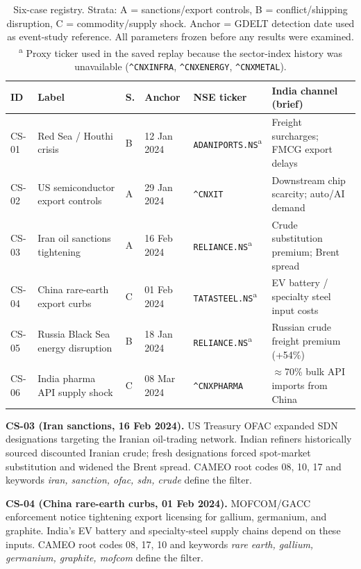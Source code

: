 \documentclass[10pt,a4paper,twocolumn]{article}
\begin{document}
\begin{table}[!t]
\centering
\caption{Six-case registry. Strata: A = sanctions/export controls, B = conflict/shipping disruption, C = commodity/supply shock. Anchor = GDELT detection date used as event-study reference. All parameters frozen before any results were examined. \textsuperscript{a} Proxy ticker used in the saved replay because the sector-index history was unavailable (\texttt{\^{}CNXINFRA}, \texttt{\^{}CNXENERGY}, \texttt{\^{}CNXMETAL}).}
\label{tab:caseregistry}
\small
\begin{tabular}{@{}p{1.0cm}p{4.2cm}p{0.6cm}p{2.1cm}p{2.3cm}p{5.0cm}@{}}
\toprule
\textbf{ID} & \textbf{Label} & \textbf{S.} & \textbf{Anchor} & \textbf{NSE ticker} & \textbf{India channel (brief)} \\
\midrule
CS-01 & Red Sea / Houthi crisis           & B & 12 Jan 2024 & \texttt{ADANIPORTS.NS}\textsuperscript{a}  & Freight surcharges; FMCG export delays \\
CS-02 & US semiconductor export controls  & A & 29 Jan 2024 & \texttt{\^{}CNXIT}                         & Downstream chip scarcity; auto/AI demand \\
CS-03 & Iran oil sanctions tightening     & A & 16 Feb 2024 & \texttt{RELIANCE.NS}\textsuperscript{a}    & Crude substitution premium; Brent spread \\
CS-04 & China rare-earth export curbs     & C & 01 Feb 2024 & \texttt{TATASTEEL.NS}\textsuperscript{a}   & EV battery / specialty steel input costs \\
CS-05 & Russia Black Sea energy disruption & B & 18 Jan 2024 & \texttt{RELIANCE.NS}\textsuperscript{a}    & Russian crude freight premium (+54\%) \\
CS-06 & India pharma API supply shock     & C & 08 Mar 2024 & \texttt{\^{}CNXPHARMA}                    & $\approx$70\% bulk API imports from China \\
\bottomrule
\end{tabular}
\end{table}

\textbf{CS-03 (Iran sanctions, 16 Feb 2024).}
US Treasury OFAC expanded SDN designations targeting the Iranian oil-trading network. Indian refiners historically sourced discounted Iranian crude; fresh designations forced spot-market substitution and widened the Brent spread. CAMEO root codes 08, 10, 17 and keywords \textit{iran, sanction, ofac, sdn, crude} define the filter.

\textbf{CS-04 (China rare-earth curbs, 01 Feb 2024).}
MOFCOM/GACC enforcement notice tightening export licensing for gallium, germanium, and graphite. India's EV battery and specialty-steel supply chains depend on these inputs. CAMEO root codes 08, 17, 10 and keywords \textit{rare earth, gallium, germanium, graphite, mofcom} define the filter.
\end{document}
